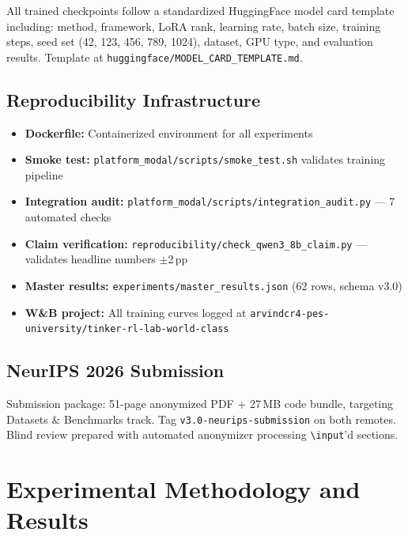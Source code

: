 \documentclass[12pt,a4paper]{report}
\theoremstyle{definition}
\begin{document}
All trained checkpoints follow a standardized HuggingFace model card template including:
method, framework, LoRA rank, learning rate, batch size, training steps, seed set (42, 123, 456, 789, 1024),
dataset, GPU type, and evaluation results. Template at \texttt{huggingface/MODEL\_CARD\_TEMPLATE.md}.

\section{Reproducibility Infrastructure}
\label{sec:repro-infra}

\begin{itemize}[nosep]
\item \textbf{Dockerfile:} Containerized environment for all experiments
\item \textbf{Smoke test:} \texttt{platform\_modal/scripts/smoke\_test.sh} validates training pipeline
\item \textbf{Integration audit:} \texttt{platform\_modal/scripts/integration\_audit.py} --- 7 automated checks
\item \textbf{Claim verification:} \texttt{reproducibility/check\_qwen3\_8b\_claim.py} --- validates headline numbers $\pm$2\,pp
\item \textbf{Master results:} \texttt{experiments/master\_results.json} (62 rows, schema v3.0)
\item \textbf{W\&B project:} All training curves logged at \texttt{arvindcr4-pes-university/tinker-rl-lab-world-class}
\end{itemize}

\section{NeurIPS 2026 Submission}
\label{sec:neurips}

Submission package: 51-page anonymized PDF + 27\,MB code bundle, targeting Datasets \& Benchmarks track.
Tag \texttt{v3.0-neurips-submission} on both remotes. Blind review prepared with automated anonymizer
processing \texttt{\textbackslash input}'d sections.




\chapter{Experimental Methodology and Results}
\label{ch:experiments}
\end{document}
